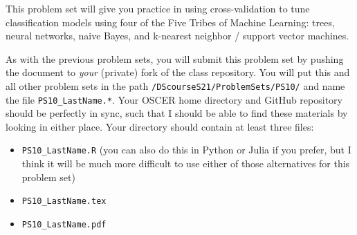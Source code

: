 \documentclass[12pt,english]{exam}
\begin{document}
This problem set will give you practice in using cross-validation to tune classification models using four of the Five Tribes of Machine Learning: trees, neural networks, naive Bayes, and k-nearest neighbor / support vector machines.

As with the previous problem sets, you will submit this problem set by pushing the document to \emph{your} (private) fork of the class repository. You will put this and all other problem sets in the path \texttt{/DScourseS21/ProblemSets/PS10/} and name the file \texttt{PS10\_LastName.*}. Your OSCER home directory and GitHub repository should be perfectly in sync, such that I should be able to find these materials by looking in either place. Your directory should contain at least three files:
\begin{itemize}
    \item \texttt{PS10\_LastName.R} (you can also do this in Python or Julia if you prefer, but I think it will be much more difficult to use either of those alternatives for this problem set)
    \item \texttt{PS10\_LastName.tex}
    \item \texttt{PS10\_LastName.pdf}
\end{itemize}
\end{document}
